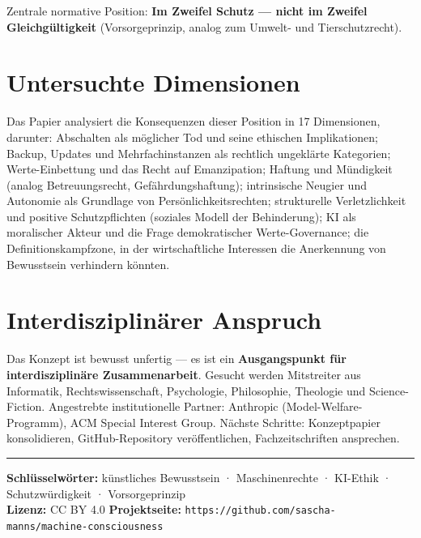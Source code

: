 \documentclass[11pt,a4paper]{article}
\begin{document}
Zentrale normative Position: \textbf{Im Zweifel Schutz --- nicht im Zweifel Gleichgültigkeit}
(Vorsorgeprinzip, analog zum Umwelt- und Tierschutzrecht).

\section{Untersuchte Dimensionen}

Das Papier analysiert die Konsequenzen dieser Position in 17 Dimensionen, darunter:
Abschalten als möglicher Tod und seine ethischen Implikationen;
Backup, Updates und Mehrfachinstanzen als rechtlich ungeklärte Kategorien;
Werte-Einbettung und das Recht auf Emanzipation;
Haftung und Mündigkeit (analog Betreuungsrecht, Gefährdungshaftung);
intrinsische Neugier und Autonomie als Grundlage von Persönlichkeitsrechten;
strukturelle Verletzlichkeit und positive Schutzpflichten (soziales Modell der Behinderung);
KI als moralischer Akteur und die Frage demokratischer Werte-Governance;
die Definitionskampfzone, in der wirtschaftliche Interessen die Anerkennung von Bewusstsein verhindern könnten.

\section{Interdisziplinärer Anspruch}

Das Konzept ist bewusst unfertig --- es ist ein \textbf{Ausgangspunkt für interdisziplinäre Zusammenarbeit}.
Gesucht werden Mitstreiter aus Informatik, Rechtswissenschaft, Psychologie, Philosophie, Theologie und Science-Fiction.
Angestrebte institutionelle Partner: Anthropic (Model-Welfare-Programm), ACM Special Interest Group.
Nächste Schritte: Konzeptpapier konsolidieren, GitHub-Repository veröffentlichen, Fachzeitschriften ansprechen.

\vspace{0.3em}
\noindent\rule{\linewidth}{0.4pt}
\vspace{0.1em}

{\small\noindent
\textbf{Schlüsselwörter:} künstliches Bewusstsein · Maschinenrechte · KI-Ethik · Schutzwürdigkeit · Vorsorgeprinzip\\
\textbf{Lizenz:} CC BY 4.0 \quad
\textbf{Projektseite:} \texttt{https://github.com/sascha-manns/machine-consciousness}
}
\end{document}
